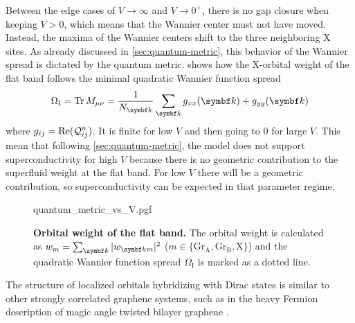 \documentclass[../main.tex]{subfiles}
\begin{document}
Between the edge cases of \(V \to \infty\) and \(V \to 0^+\), there is no gap closure when keeping \(V > 0\), which means that the Wannier center must not have moved.
Instead, the maxima of the Wannier centers shift to the three neighboring \(\mathrm{X}\) sites.
As already discussed in \cref{sec:quantum-metric}, this behavior of the Wannier spread is dictated by the quantum metric.
 shows how the \(\mathrm{X}\)-orbital weight of the flat band follows the minimal quadratic Wannier function spread \cite{peottaSuperfluidityTopologicallyNontrivial2015, wittQuantumGeometryLocal2025, marzariMaximallyLocalizedWannier2012}
\begin{equation}
	\Omega_{\mathrm{I}} = \Tr M_{\mu \nu} = \frac{1}{N_{\vb{k}}} \sum_{\vb{k}} g_{xx} (\vb{k}) + g_{yy} (\vb{k})
\end{equation}
where \(g_{ij} = \mathrm{Re}(\mathcal{Q}_{ij}^n)\).
It is finite for low \(V\) and then going to 0 for large \(V\).
This mean that following \cref{sec:quantum-metric}, the model does not support superconductivity for high \(V\) because there is no geometric contribution to the superfluid weight at the flat band.
For low \(V\) there will be a geometric contribution, so superconductivity can be expected in that parameter regime.
\begin{SCfigure}[1][t]
	\centering
	{quantum_metric_vs_V.pgf}
	\caption[Orbital weight of the flat band.]{\textbf{Orbital weight of the flat band.} The orbital weight is calculated as \(w_m = \sum_{\vb{k}} \vert w_{\vb{k} m} \vert^2\) (\(m \in \{\mathrm{Gr}_{\mathrm{A}}, \mathrm{Gr}_{\mathrm{B}}, \mathrm{X}\}\)) and the quadratic Wannier function spread \(\Omega_{\mathrm{I}}\) is marked as a dotted line.}
	\label{fig:decorated graphene model quantum metric}
\end{SCfigure}

The structure of localized orbitals hybridizing with Dirac states is similar to other strongly correlated graphene systems, such as in the heavy Fermion description of magic angle twisted bilayer graphene \cite{songMagicAngleTwistedBilayer2022, herzog-arbeitmanTopologicalHeavyFermion2024}.
	
\end{document}
